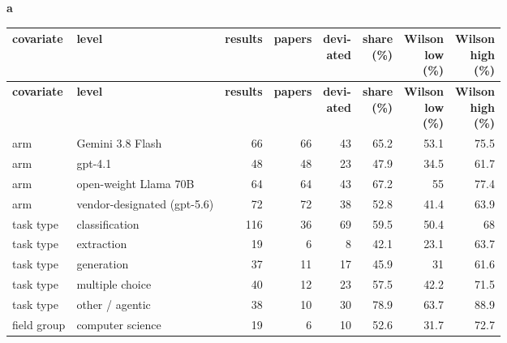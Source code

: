 \noindent\textbf{a}\par\smallskip
\begingroup\scriptsize\setlength{\tabcolsep}{2.5pt}\renewcommand{\arraystretch}{1.08}
\begin{longtable}{>{\raggedright\arraybackslash}p{20mm}>{\raggedright\arraybackslash}p{28mm}rrrrrr}
\toprule
\textbf{covariate} & \textbf{level} & \textbf{results} & \textbf{papers} & \shortstack[r]{\textbf{devi-\allowbreak{}}\\\textbf{ated}} & \shortstack[r]{\textbf{share}\\\textbf{(\%)}} & \shortstack[r]{\textbf{Wilson}\\\textbf{low}\\\textbf{(\%)}} & \shortstack[r]{\textbf{Wilson}\\\textbf{high}\\\textbf{(\%)}} \\
\midrule
\endfirsthead
\toprule
\textbf{covariate} & \textbf{level} & \textbf{results} & \textbf{papers} & \shortstack[r]{\textbf{devi-\allowbreak{}}\\\textbf{ated}} & \shortstack[r]{\textbf{share}\\\textbf{(\%)}} & \shortstack[r]{\textbf{Wilson}\\\textbf{low}\\\textbf{(\%)}} & \shortstack[r]{\textbf{Wilson}\\\textbf{high}\\\textbf{(\%)}} \\
\midrule
\endhead
\bottomrule
\endfoot
arm & Gemini 3.8 Flash & 66 & 66 & 43 & 65.2 & 53.1 & 75.5 \\
arm & gpt-\allowbreak{}4.1 & 48 & 48 & 23 & 47.9 & 34.5 & 61.7 \\
arm & open-\allowbreak{}weight Llama 70B & 64 & 64 & 43 & 67.2 & 55 & 77.4 \\
arm & vendor-\allowbreak{}designated (gpt-\allowbreak{}5.6) & 72 & 72 & 38 & 52.8 & 41.4 & 63.9 \\
task type & classification & 116 & 36 & 69 & 59.5 & 50.4 & 68 \\
task type & extraction & 19 & 6 & 8 & 42.1 & 23.1 & 63.7 \\
task type & generation & 37 & 11 & 17 & 45.9 & 31 & 61.6 \\
task type & multiple choice & 40 & 12 & 23 & 57.5 & 42.2 & 71.5 \\
task type & other /\allowbreak{} agentic & 38 & 10 & 30 & 78.9 & 63.7 & 88.9 \\
field group & computer science & 19 & 6 & 10 & 52.6 & 31.7 & 72.7 \\

\end{longtable}

